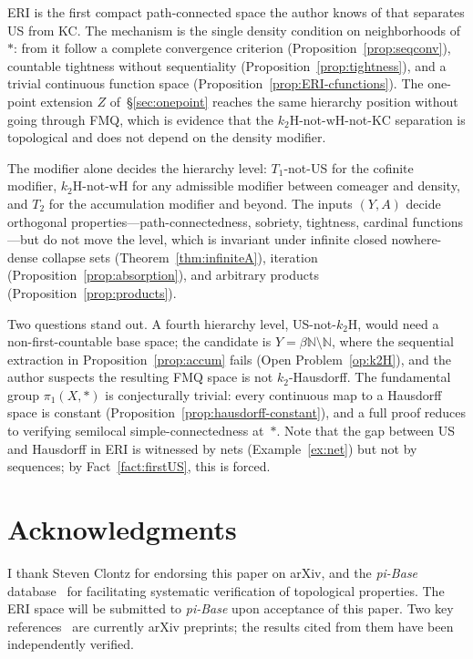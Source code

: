 \documentclass[11pt]{article}
\theoremstyle{definition}
\theoremstyle{remark}
\begin{document}
ERI is the first compact path-connected space the author knows of
that separates US from KC.
The mechanism is the single density condition on neighborhoods of
$\ast$: from it follow a complete convergence criterion
(Proposition~\ref{prop:seqconv}), countable tightness without
sequentiality (Proposition~\ref{prop:tightness}), and a trivial
continuous function space (Proposition~\ref{prop:ERI-cfunctions}).
The one-point extension $Z$ of~\S\ref{sec:onepoint} reaches the same
hierarchy position without going through FMQ, which is evidence that
the $k_2\mathrm{H}$-not-$\mathrm{wH}$-not-$\mathrm{KC}$ separation is
topological and does not depend on the density modifier.

The modifier alone decides the hierarchy level: $T_1$-not-US for the
cofinite modifier, $k_2\mathrm{H}$-not-$\mathrm{wH}$ for any
admissible modifier between comeager and density, and $T_2$ for the
accumulation modifier and beyond.
The inputs $(Y, A)$ decide orthogonal properties---path-connectedness,
sobriety, tightness, cardinal functions---but do not move the level,
which is invariant under infinite closed nowhere-dense collapse sets
(Theorem~\ref{thm:infiniteA}), iteration
(Proposition~\ref{prop:absorption}), and arbitrary products
(Proposition~\ref{prop:products}).

Two questions stand out.
A fourth hierarchy level, US-not-$k_2\mathrm{H}$, would need a
non-first-countable base space; the candidate is
$Y = \beta\mathbb{N} \setminus \mathbb{N}$, where the sequential
extraction in Proposition~\ref{prop:accum} fails
(Open Problem~\ref{op:k2H}), and the author suspects the resulting
FMQ space is not $k_2$-Hausdorff.
The fundamental group $\pi_1(X, \ast)$ is conjecturally trivial: every
continuous map to a Hausdorff space is constant
(Proposition~\ref{prop:hausdorff-constant}), and a full proof reduces
to verifying semilocal simple-connectedness at~$\ast$.
Note that the gap between US and Hausdorff in ERI is witnessed by nets
(Example~\ref{ex:net}) but not by sequences; by
Fact~\ref{fact:firstUS}, this is forced.


\section{Acknowledgments}
I thank Steven Clontz for endorsing this paper
on arXiv, and the
\emph{pi-Base} database~\cite{bib:pibase} for facilitating systematic
verification of topological properties.
The ERI space will be submitted to \emph{pi-Base} upon
acceptance of this paper.
Two key references~\cite{bib:clontz,bib:clontzwilliams} are currently arXiv
preprints; the results cited from them have been independently
verified.
\end{document}
